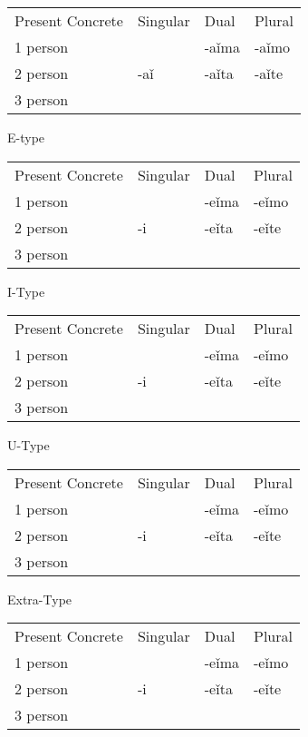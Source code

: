 \begin{table}
	\begin{tabular}{llll}
		Present Concrete & Singular & Dual & Plural \\
		1 person &  & -aǐma & -aǐmo \\
		2 person & -aǐ & -aǐta & -aǐte \\
		3 person &  &  & 
	\end{tabular}
\end{table}

E-type

\begin{table}
	\begin{tabular}{llll}
		Present Concrete & Singular & Dual & Plural \\
		1 person &  & -eǐma & -eǐmo \\
		2 person & -i & -eǐta & -eǐte \\
		3 person &  &  & 
	\end{tabular}
\end{table}

I-Type

\begin{table}
	\begin{tabular}{llll}
		Present Concrete & Singular & Dual & Plural \\
		1 person &  & -eǐma & -eǐmo \\
		2 person & -i & -eǐta & -eǐte \\
		3 person &  &  & 
	\end{tabular}
\end{table}

U-Type

\begin{table}
	\begin{tabular}{llll}
		Present Concrete & Singular & Dual & Plural \\
		1 person &  & -eǐma & -eǐmo \\
		2 person & -i & -eǐta & -eǐte \\
		3 person &  &  & 
	\end{tabular}
\end{table}

Extra-Type

\begin{table}
	\begin{tabular}{llll}
		Present Concrete & Singular & Dual & Plural \\
		1 person &  & -eǐma & -eǐmo \\
		2 person & -i & -eǐta & -eǐte \\
		3 person &  &  & 
	\end{tabular}
\end{table}

